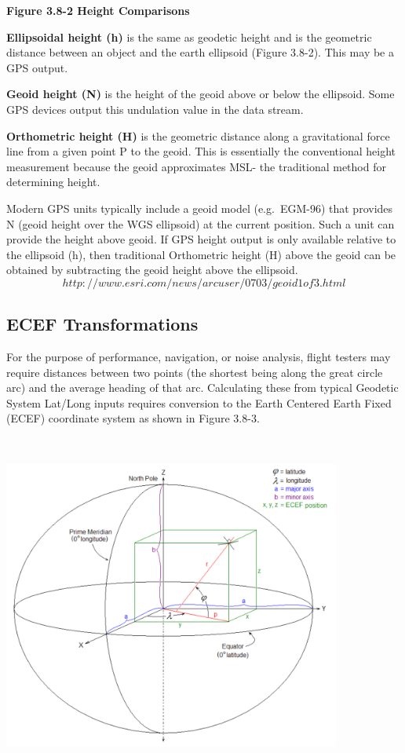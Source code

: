 \documentclass[
]{book}
\begin{document}
\textbf{Figure 3.8-2 Height Comparisons}

\textbf{Ellipsoidal height (h)} is the same as geodetic height and is the geometric distance between an object and the earth ellipsoid (Figure 3.8-2). This may be a GPS output.

\textbf{Geoid height (N)} is the height of the geoid above or below the ellipsoid. Some GPS devices output this undulation value in the data stream.

\textbf{Orthometric height (H)} is the geometric distance along a gravitational force line from a given point P to the geoid. This is essentially the conventional height measurement because the geoid approximates MSL- the traditional method for determining height.

Modern GPS units typically include a geoid model (e.g.~EGM-96) that provides N (geoid height over the WGS ellipsoid) at the current position. Such a unit can provide the height above geoid. If GPS height output is only available relative to the ellipsoid (h), then traditional Orthometric height (H) above the geoid can be obtained by subtracting the geoid height above the ellipsoid. \[http://www.esri.com/news/arcuser/0703/geoid1of3.html\]

\hypertarget{ecef-transformations}{%
\subsection*{ECEF Transformations}\label{ecef-transformations}}

For the purpose of performance, navigation, or noise analysis, flight testers may require distances between two points (the shortest being along the great circle arc) and the average heading of that arc. Calculating these from typical Geodetic System Lat/Long inputs requires conversion to the Earth Centered Earth Fixed (ECEF) coordinate system as shown in Figure 3.8-3.

\includegraphics[width=4.37408in,height=4.46226in]{media/03/image31.svg}
\end{document}
